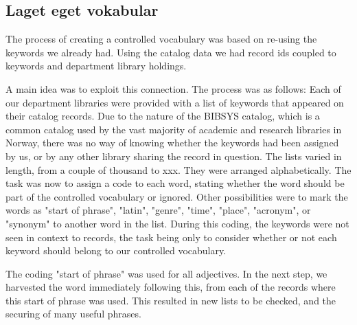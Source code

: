 \subsection{Laget eget vokabular}
The process of creating a controlled vocabulary was based on re-using the keywords we already had. Using the catalog data we had record ids coupled to keywords and department library holdings. 

A main idea was to exploit this connection. The process was as follows: Each of our department libraries were provided with a list of keywords that appeared on their catalog records. Due to the nature of the BIBSYS catalog, which is a common catalog used by the vast majority of academic and research libraries in Norway, there was no way of knowing whether the keywords had been assigned by us, or by any other library sharing the record in question. The lists varied in length, from a couple of thousand to xxx. They were arranged alphabetically. The task was now to assign a code to each word, stating whether the word should be part of the controlled vocabulary or ignored. Other possibilities were to mark the words as "start of phrase", "latin", "genre", "time", "place", "acronym", or "synonym" to another word in the list. During this coding, the keywords were not seen in context to records, the task being only to consider whether or not each keyword should belong to our controlled vocabulary. 

The coding "start of phrase" was used for all adjectives. In the next step, we harvested the word immediately following this, from each of the records where this start of phrase was used. This resulted in new lists to be checked, and the securing of many useful phrases. 